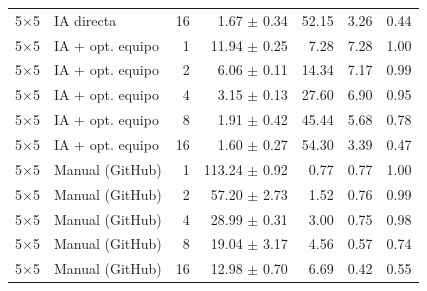 \begin{tabular}{llrrrrr}
5$\times$5 & IA directa & 16 & 1.67 $\pm$ 0.34 & 52.15 & 3.26 & 0.44 \\
5$\times$5 & IA + opt. equipo & 1 & 11.94 $\pm$ 0.25 & 7.28 & 7.28 & 1.00 \\
5$\times$5 & IA + opt. equipo & 2 & 6.06 $\pm$ 0.11 & 14.34 & 7.17 & 0.99 \\
5$\times$5 & IA + opt. equipo & 4 & 3.15 $\pm$ 0.13 & 27.60 & 6.90 & 0.95 \\
5$\times$5 & IA + opt. equipo & 8 & 1.91 $\pm$ 0.42 & 45.44 & 5.68 & 0.78 \\
5$\times$5 & IA + opt. equipo & 16 & 1.60 $\pm$ 0.27 & 54.30 & 3.39 & 0.47 \\
5$\times$5 & Manual (GitHub) & 1 & 113.24 $\pm$ 0.92 & 0.77 & 0.77 & 1.00 \\
5$\times$5 & Manual (GitHub) & 2 & 57.20 $\pm$ 2.73 & 1.52 & 0.76 & 0.99 \\
5$\times$5 & Manual (GitHub) & 4 & 28.99 $\pm$ 0.31 & 3.00 & 0.75 & 0.98 \\
5$\times$5 & Manual (GitHub) & 8 & 19.04 $\pm$ 3.17 & 4.56 & 0.57 & 0.74 \\
5$\times$5 & Manual (GitHub) & 16 & 12.98 $\pm$ 0.70 & 6.69 & 0.42 & 0.55 \\
\bottomrule
\end{tabular}
